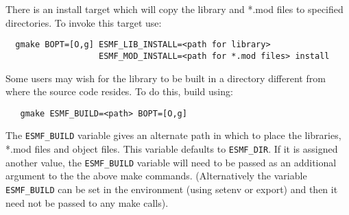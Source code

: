 There is an install target which will copy the library and *.mod files to
specified directories.  To invoke this target use:
\begin{verbatim}
  gmake BOPT=[O,g] ESMF_LIB_INSTALL=<path for library>
                   ESMF_MOD_INSTALL=<path for *.mod files> install 
\end{verbatim}

Some users may wish for the library to be built in a directory different from 
where the source code resides.  To do this, build using:
\begin{verbatim}
   gmake ESMF_BUILD=<path> BOPT=[O,g]
\end{verbatim}

The {\tt ESMF\_BUILD} variable gives an alternate path in which to
place the libraries, *.mod files and object files.  This variable
defaults to {\tt ESMF\_DIR}.  If it is assigned another value, the
{\tt ESMF\_BUILD} variable will need to be passed as an additional
argument to the the above make commands.  (Alternatively the variable
{\tt ESMF\_BUILD} can be set in the environment (using setenv or
export) and then it need not be passed to any make calls).
